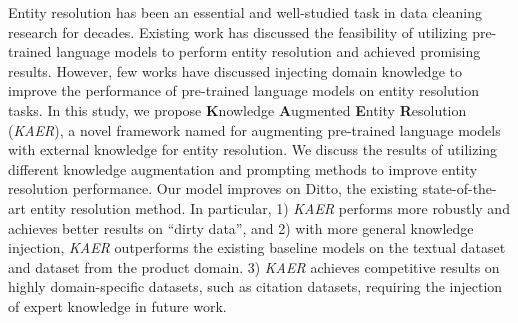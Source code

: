 
Entity resolution has been an essential and well-studied task in data cleaning research for decades. 
Existing work has discussed the feasibility of utilizing pre-trained language models to perform entity resolution and achieved promising results.
However, few works have discussed injecting domain knowledge to improve the performance of pre-trained language models on entity resolution tasks. 
In this study, we propose \textbf{K}nowledge \textbf{A}ugmented \textbf{E}ntity \textbf{R}esolution (\textit{KAER}), a novel framework named for augmenting pre-trained language models with external knowledge for entity resolution. We discuss the results of utilizing different knowledge augmentation and prompting methods to improve entity resolution performance. %
Our model improves on Ditto, the existing state-of-the-art entity resolution method. In particular, 1) \textit{KAER} performs more robustly and achieves better results on ``dirty data'', and 2) with more general knowledge injection, \textit{KAER} outperforms the existing baseline models on the textual dataset and dataset from the product domain. 3) \textit{KAER} achieves competitive results on highly domain-specific datasets, such as citation datasets, requiring the injection of expert knowledge in future work. 
